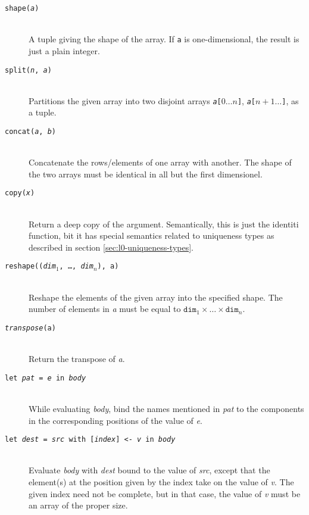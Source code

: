\documentclass[oneside]{memoir}
\begin{document}
\begin{description}
  \item[\texttt{shape(\textit{a})}]\hfill\\
    A tuple giving the shape of the array.  If \texttt{a} is
    one-dimensional, the result is just a plain integer.

  \item[\texttt{split(\textit{n}, \textit{a})}]\hfill\\
    Partitions the given array into two disjoint arrays
    \texttt{\textit{a}[$0\ldots{}n$]}, \texttt{\textit{a}[$n+1\ldots{}$]}, as a tuple.

  \item[\texttt{concat(\textit{a}, \textit{b})}]\hfill\\
    Concatenate the rows/elements of one array with another.  The
    shape of the two arrays must be identical in all but the first
    dimensionel.

  \item[\texttt{copy(\textit{x})}]\hfill\\
    Return a deep copy of the argument.  Semantically, this is just
    the identiti function, bit it has special semantics related to
    uniqueness types as described in section
    \ref{sec:l0-uniqueness-types}.

  \item[\texttt{reshape((\textit{dim}$_{1}$, \ldots, \textit{dim}$_{n}$), a)}]\hfill\\
    Reshape the elements of the given array into the specified shape.
    The number of elements in \textit{a} must be equal to
    $\texttt{dim}_{1}\times\ldots\times\texttt{dim}_{n}$.

  \item[\texttt{\textit{transpose}(a)}]\hfill\\
    Return the transpose of \textit{a}.

  \item[\texttt{let \textit{pat} = \textit{e} in \textit{body}}]\hfill\\
    While evaluating \textit{body}, bind the names mentioned in
    \textit{pat} to the components in the corresponding positions of
    the value of \textit{e}.

  \item[\texttt{let \textit{dest} = \textit{src} with [\textit{index}] <- \textit{v} in \textit{body}}] \hfill \\
    Evaluate \textit{body} with \textit{dest} bound to the value of
    \textit{src}, except that the element(s) at the position given by
    the index take on the value of \textit{v}.  The given index need
    not be complete, but in that case, the value of \textit{v} must be
    an array of the proper size.


\end{description}
\end{document}
